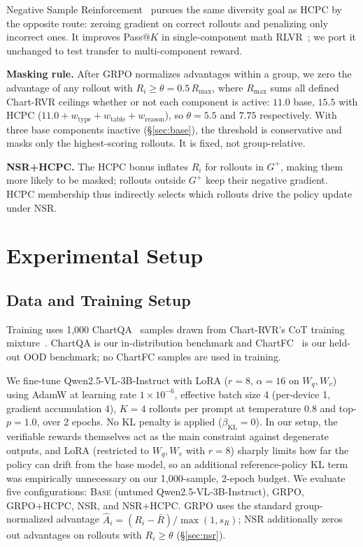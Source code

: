 \documentclass[11pt]{article}
\begin{document}
Negative Sample Reinforcement~\citep{zhu2025nsr} pursues the same
diversity goal as HCPC by the opposite route: zeroing gradient on
correct rollouts and penalizing only incorrect ones. It improves
Pass@$K$ in single-component math RLVR~\citep{zhu2025nsr}; we port
it unchanged to test transfer to multi-component reward.

\textbf{Masking rule.}
After GRPO normalizes advantages within a group, we zero the
advantage of any rollout with $R_i \ge \theta = 0.5\,R_{\max}$,
where $R_{\max}$ sums all defined Chart-RVR ceilings whether or not
each component is active: $11.0$ base, $15.5$ with HCPC
($11.0 + w_{\text{type}} + w_{\text{table}} + w_{\text{reason}}$),
so $\theta{=}5.5$ and $7.75$ respectively. With three base
components inactive (\S\ref{sec:base}), the threshold is
conservative and
masks only the highest-scoring rollouts. It is fixed, not
group-relative.

\textbf{NSR+HCPC.}
The HCPC bonus inflates $R_i$ for rollouts in $G^+$, making them
more likely to be masked; rollouts outside $G^+$ keep their
negative gradient. HCPC membership thus indirectly selects which
rollouts drive the policy update under NSR.

\section{Experimental Setup}
\label{sec:experiments}

\subsection{Data and Training Setup}
\label{sec:setup}

Training uses 1{,}000 ChartQA~\citep{chartqa} samples drawn from
Chart-RVR's CoT training mixture~\citep{chartrvr2025}. ChartQA is
our in-distribution benchmark and ChartFC~\citep{chartfc} is our
held-out OOD benchmark; no ChartFC samples are used in training.

We fine-tune Qwen2.5-VL-3B-Instruct with LoRA ($r{=}8$,
$\alpha{=}16$ on $W_q, W_v$) using AdamW at learning rate
$1\!\times\!10^{-6}$, effective batch size 4 (per-device 1, gradient
accumulation 4), $K{=}4$ rollouts per prompt at temperature 0.8 and
top-$p{=}1.0$, over 2 epochs. No KL penalty is applied
($\beta_{\text{KL}}{=}0$). In our setup, the verifiable rewards
themselves act as the main constraint against degenerate outputs,
and LoRA (restricted to $W_q, W_v$ with $r{=}8$) sharply limits how
far the policy can drift from the base model, so an additional
reference-policy KL term was empirically unnecessary on our 1{,}000-sample,
2-epoch budget. We evaluate five configurations:
\textsc{Base} (untuned Qwen2.5-VL-3B-Instruct), \textsc{GRPO},
\textsc{GRPO+HCPC}, \textsc{NSR}, and \textsc{NSR+HCPC}. \textsc{GRPO}
uses the standard group-normalized advantage $\hat{A}_i =
(R_i - \bar{R})/\max(1, s_R)$; \textsc{NSR} additionally zeros out
advantages on rollouts with $R_i \ge \theta$ (\S\ref{sec:nsr}).
\end{document}
